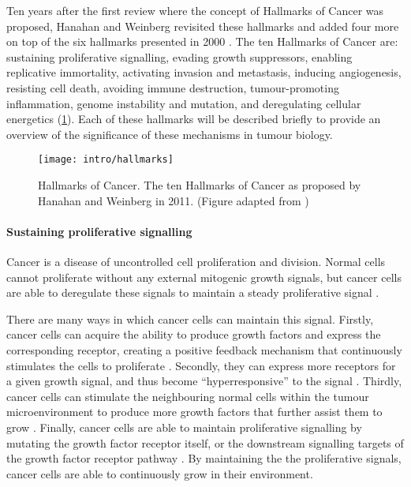 Ten years after the first review where the concept of Hallmarks of Cancer was proposed, Hanahan and Weinberg revisited these hallmarks and added four more on top of the six hallmarks presented in 2000 \citep{Hanahan2011}.
The ten Hallmarks of Cancer are: sustaining proliferative signalling, evading growth suppressors, enabling replicative immortality, activating invasion and metastasis, inducing angiogenesis, resisting cell death, avoiding immune destruction, tumour-promoting inflammation, genome instability and mutation, and deregulating cellular energetics (\cref{fig:hallmarks}).
Each of these hallmarks will be described briefly to provide an overview of the significance of these mechanisms in tumour biology.

\begin{figure}[h!]
	\centering
	\texttt{[image: intro/hallmarks]}
	\caption[Hallmarks of Cancer]{Hallmarks of Cancer. The ten Hallmarks of Cancer as proposed by Hanahan and Weinberg in 2011. (Figure adapted from \citet{Hanahan2011})}
	\label{fig:hallmarks}
\end{figure}

\paragraph{Sustaining proliferative signalling}

\noindent
Cancer is a disease of uncontrolled cell proliferation and division.
Normal cells cannot proliferate without any external mitogenic growth signals, but cancer cells are able to deregulate these signals to maintain a steady proliferative signal \citep{Hanahan2011}.

There are many ways in which cancer cells can maintain this signal.
Firstly, cancer cells can acquire the ability to produce growth factors and express the corresponding receptor, creating a positive feedback mechanism that continuously stimulates the cells to proliferate \citep{Hanahan2000}.
Secondly, they can express more receptors for a given growth signal, and thus become ``hyperresponsive'' to the signal \citep{Hanahan2000,Hanahan2011}.
Thirdly, cancer cells can stimulate the neighbouring normal cells within the tumour microenvironment to produce more growth factors that further assist them to grow \citep{Bhowmick2004, Liotta2001, Wiseman2002}.
Finally, cancer cells are able to maintain proliferative signalling by mutating the growth factor receptor itself, or the downstream signalling targets of the growth factor receptor pathway \citep{Fuqua1991,SuHuang1997,Satyamoorthy2003}.
By maintaining the the proliferative signals, cancer cells are able to continuously grow in their environment.

